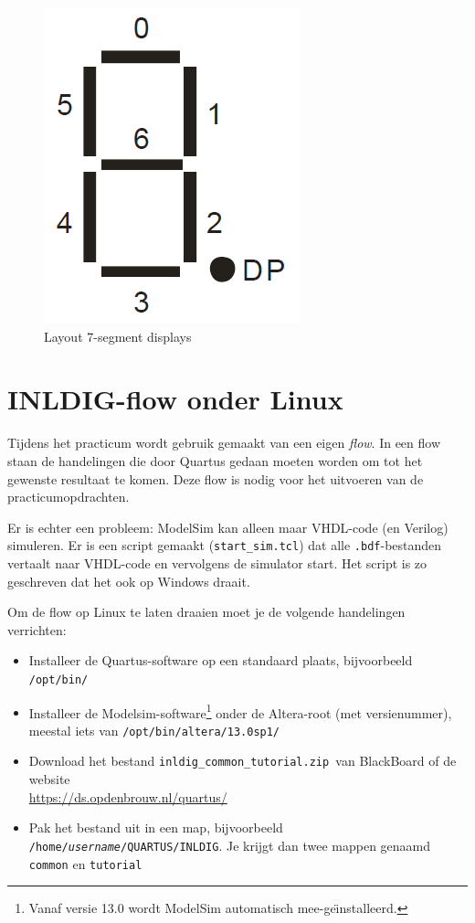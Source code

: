 \documentclass[a4paper,12pt,fleqn,twoside]{book}
\newcommand{\naam}[1]{\texttt{#1}}
\begin{document}
\begin{figure}[H]
\centering
\includegraphics[scale=0.25]{004layout7seg.png}
\caption{Layout 7-segment displays}
\label{fig:004layout7seg}
\end{figure}



\chapter{INLDIG-flow onder Linux}
\label{chap:inldigflowonderlinux}
Tijdens het practicum wordt gebruik gemaakt van een eigen \textsl{flow}.
In een flow staan de handelingen die door Quartus gedaan moeten worden om
tot het gewenste resultaat te komen. Deze flow is nodig voor het uitvoeren
van de practicumopdrachten. 

Er is echter een probleem: ModelSim kan alleen maar VHDL-code (en Verilog)
simuleren. Er is een script gemaakt (\lstinline|start_sim.tcl|) dat alle
\naam{.bdf}-bestanden vertaalt naar VHDL-code en vervolgens de simulator
start. Het script is zo geschreven dat het ook op Windows draait.

Om de flow op Linux te laten draaien moet je de volgende handelingen
verrichten:

\begin{itemize}\itemsep-1pt
\item Installeer de Quartus-software op een standaard plaats, bijvoorbeeld
      \lstinline|/opt/bin/|
\item Installeer de Modelsim-software\footnote{Vanaf versie 13.0 wordt
      ModelSim automatisch mee-ge\"{\i}nstalleerd.} onder de Altera-root
      (met versienummer), meestal iets van \lstinline|/opt/bin/altera/13.0sp1/| 
\item Download het bestand \lstinline|inldig_common_tutorial.zip |van
      BlackBoard of de website\\ \url{https://ds.opdenbrouw.nl/quartus/} 
\item Pak het bestand uit in een map, bijvoorbeeld
      \naam{/home/\textsl{username}/QUARTUS/INLDIG}. Je krijgt dan twee
      mappen genaamd \naam{common} en \naam{tutorial}
\end{itemize}
\end{document}
